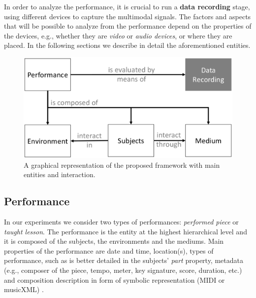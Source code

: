 \documentclass[conference]{IEEEtran}
\begin{document}



In order to analyze the performance, it is crucial to run a \textbf{data recording} stage, using different devices to capture the multimodal signals. The factors and aspects that will be possible to analyze from the performance depend on the properties of the devices, e.g., whether they are \textit{video} or \textit{audio devices}, or where they are placed. In the following sections we describe in detail the aforementioned entities.



\begin{figure}[t]
	\centering
	\includegraphics[width=\columnwidth]{img/framework.eps}
	\caption{A graphical representation of the proposed framework with main entities and interaction.}
	\label{fig:framework}
\end{figure}

\subsection{Performance}
In our experiments we consider two types of performances: \textit{performed piece} or \textit{taught lesson}. The performance is the entity at the highest hierarchical level and it is composed of the subjects, the environments and the mediums. 
Main properties of the performance are date and time, location(s), types of performance, such as is better detailed in the subjects' \textit{part} property, metadata (e.g., composer of the piece, tempo, meter, key signature, score, duration, etc.) and composition  description in form of symbolic representation (MIDI or musicXML) \cite{MIDItoolbox}.
\end{document}
